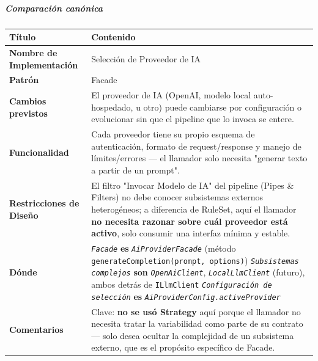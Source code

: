 \subparagraph{Comparación canónica}
{\small\setlength{\tabcolsep}{4pt}\renewcommand{\arraystretch}{1.15}
\begin{longtable}{|>{\raggedright\arraybackslash}p{3.4cm}|>{\raggedright\arraybackslash}p{11.9cm}|}
\hline
\textbf{Título} & \textbf{Contenido} \\ \hline\endhead
\textbf{Nombre de Implementación} & Selección de Proveedor de IA \\ \hline
\textbf{Patrón} & Facade \\ \hline
\textbf{Cambios previstos} & El proveedor de IA (OpenAI, modelo local auto-hospedado, u otro) puede cambiarse por configuración o evolucionar sin que el pipeline que lo invoca se entere. \\ \hline
\textbf{Funcionalidad} & Cada proveedor tiene su propio esquema de autenticación, formato de request/response y manejo de límites/errores — el llamador solo necesita "generar texto a partir de un prompt". \\ \hline
\textbf{Restricciones de Diseño} & El filtro "Invocar Modelo de IA" del pipeline (Pipes \& Filters) no debe conocer subsistemas externos heterogéneos; a diferencia de RuleSet, aquí el llamador \textbf{no necesita razonar sobre cuál proveedor está activo}, solo consumir una interfaz mínima y estable. \\ \hline
\textbf{Dónde} & \textit{\texttt{Facade}} \textbf{es} \textit{\texttt{AiProviderFacade}} (método \texttt{generateCompletion(prompt, options)}) \newline{} \textit{\texttt{Subsistemas complejos}} \textbf{son} \textit{\texttt{OpenAiClient}}, \textit{\texttt{LocalLlmClient}} (futuro), ambos detrás de \texttt{ILlmClient} \newline{} \textit{\texttt{Configuración de selección}} \textbf{es} \textit{\texttt{AiProviderConfig.\allowbreak{}activeProvider}} \\ \hline
\textbf{Comentarios} & Clave: \textbf{no se usó Strategy} aquí porque el llamador no necesita tratar la variabilidad como parte de su contrato — solo desea ocultar la complejidad de un subsistema externo, que es el propósito específico de Facade. \\ \hline
\end{longtable}}
